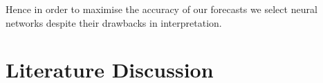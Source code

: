\documentclass[11pt]{article}
\begin{document}










\noindent Hence in order to maximise the accuracy of our forecasts we select neural networks despite their drawbacks in interpretation. 

\section{Literature Discussion}
\label{section:literature_discussion}
\end{document}
